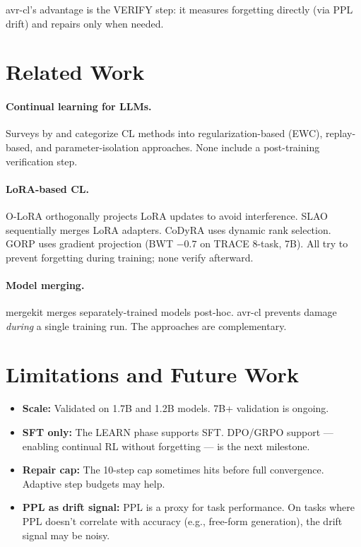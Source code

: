 \documentclass{article}
\begin{document}
avr-cl's advantage is the VERIFY step: it measures forgetting directly (via PPL drift) and repairs only when needed.

\section{Related Work}

\paragraph{Continual learning for LLMs.} Surveys by \cite{razzak2024clllm} and \cite{wang2024clllm} categorize CL methods into regularization-based (EWC), replay-based, and parameter-isolation approaches. None include a post-training verification step.

\paragraph{LoRA-based CL.} O-LoRA \cite{wang2023olora} orthogonally projects LoRA updates to avoid interference. SLAO \cite{wang2024slao} sequentially merges LoRA adapters. CoDyRA \cite{2025codyra} uses dynamic rank selection. GORP \cite{2025gorp} uses gradient projection (BWT $-0.7$ on TRACE 8-task, 7B). All try to prevent forgetting during training; none verify afterward.

\paragraph{Model merging.} mergekit \cite{goddard2024mergekit} merges separately-trained models post-hoc. avr-cl prevents damage \emph{during} a single training run. The approaches are complementary.

\section{Limitations and Future Work}

\begin{itemize}
    \item \textbf{Scale:} Validated on 1.7B and 1.2B models. 7B+ validation is ongoing.
    \item \textbf{SFT only:} The LEARN phase supports SFT. DPO/GRPO support — enabling continual RL without forgetting — is the next milestone.
    \item \textbf{Repair cap:} The 10-step cap sometimes hits before full convergence. Adaptive step budgets may help.
    \item \textbf{PPL as drift signal:} PPL is a proxy for task performance. On tasks where PPL doesn't correlate with accuracy (e.g., free-form generation), the drift signal may be noisy.
\end{itemize}
\end{document}
